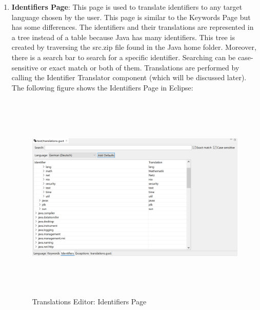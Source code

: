 \begin{enumerate}
    \item \textbf{Identifiers Page}: This page is used to translate identifiers to any target language chosen by the user. This page is similar to the Keywords Page but has some differences. The identifiers and their translations are represented in a tree instead of a table because Java has many identifiers. This tree is created by traversing the src.zip file found in the Java home folder. Moreover, there is a search bar to search for a specific identifier. Searching can be case-sensitive or exact match or both of them. Translations are performed by calling the Identifier Translator component (which will be discussed later). The following figure shows the Identifiers Page in Eclipse:

    \begin{figure}[H]
    \centering
    \includegraphics[width=15cm, height=10cm]{ch3-images/identifierspage.png}
    \caption{Translations Editor: Identifiers Page}
    \label{fig:Translations Editor: Identifiers Page}
    \end{figure}
    

\end{enumerate}

